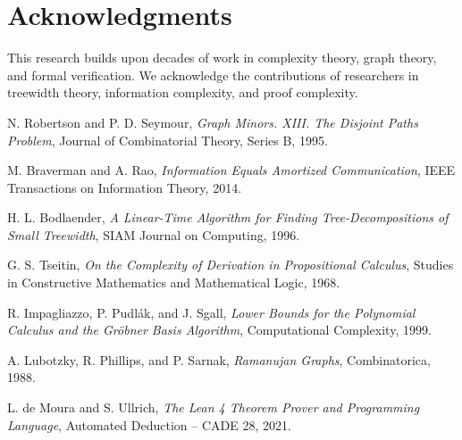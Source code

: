 \documentclass[11pt]{article}
\begin{document}
\section*{Acknowledgments}

This research builds upon decades of work in complexity theory, graph theory, and formal verification. We acknowledge the contributions of researchers in treewidth theory, information complexity, and proof complexity.


\begin{thebibliography}{99}

N. Robertson and P. D. Seymour,
\emph{Graph Minors. XIII. The Disjoint Paths Problem},
Journal of Combinatorial Theory, Series B, 1995.

M. Braverman and A. Rao,
\emph{Information Equals Amortized Communication},
IEEE Transactions on Information Theory, 2014.

H. L. Bodlaender,
\emph{A Linear-Time Algorithm for Finding Tree-Decompositions of Small Treewidth},
SIAM Journal on Computing, 1996.

G. S. Tseitin,
\emph{On the Complexity of Derivation in Propositional Calculus},
Studies in Constructive Mathematics and Mathematical Logic, 1968.

R. Impagliazzo, P. Pudlák, and J. Sgall,
\emph{Lower Bounds for the Polynomial Calculus and the Gröbner Basis Algorithm},
Computational Complexity, 1999.

A. Lubotzky, R. Phillips, and P. Sarnak,
\emph{Ramanujan Graphs},
Combinatorica, 1988.

L. de Moura and S. Ullrich,
\emph{The Lean 4 Theorem Prover and Programming Language},
Automated Deduction -- CADE 28, 2021.

\end{thebibliography}
\end{document}
